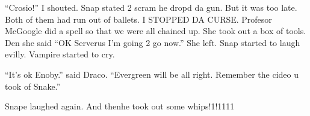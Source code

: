 \enquote{Crosio!} I shouted. Snap stated 2 scram he dropd da gun. But it was too late. Both of them had run out of ballets. I STOPPED DA CURSE\@. Profesor McGoogle did a spell so that we were all chained up. She took out a box of tools. Den she said \enquote{OK Serverus I'm going 2 go now.} She left. Snap started to laugh evilly. Vampire started to cry.

\enquote{It's ok Enoby.} said Draco. \enquote{Evergreen will be all right. Remember the cideo u took of Snake.}

Snape laughed again. And then\dotfill\newline he took out some whips!1!1111
